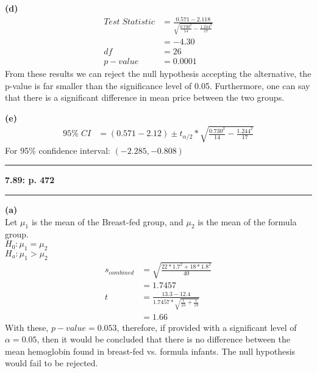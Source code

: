\documentclass[11pt]{article}
\newcommand\question[2]{\vspace{.25in}\hrule\textbf{#1: #2}\vspace{.5em}\hrule\vspace{.10in}}
\renewcommand\part[1]{\vspace{.10in}\textbf{(#1)}}
\begin{document}
\part{d}\\
	\begin{align*}
		Test\; Statistic &= \frac{0.571-2.118}{\sqrt{\frac{0.730^{2}}{14}-\frac{1.244^{2}}{17}}}\\
		&= -4.30\\
		df &= 26\\
		p-value &= 0.0001
	\end{align*}
	From these results we can reject the null hypothesis accepting the alternative, the p-value is far smaller than the significance level of 0.05. Furthermore, one can say that there is a significant difference in mean price between the two groups.

\part{e}\\
	\begin{align*}
		95\% \; CI &= (0.571-2.12) \pm t_{\alpha / 2} * \sqrt{\frac{0.730^{2}}{14}-\frac{1.244^{2}}{17}}
	\end{align*}
	For 95\% confidence interval: $(-2.285, -0.808)$

\question{7.89}{p. 472}

	\part{a}\\
		Let $\mu_{1}$ is the mean of the Breast-fed group, and $\mu_{2}$ is the mean of the formula group.\\
		$H_{0} : \mu_{1} = \mu_{2}$\\
		$H_{a} : \mu_{1} > \mu_{2}$\\
		\begin{align*}
			s_{combined} &= \sqrt{ \frac{ 22*1.7^{2} + 18*1.8^{2}}{40} }\\
			&= 1.7457\\
			t &= \frac{13.3-12.4}{1.7457*\sqrt{\frac{1}{23}+\frac{1}{19}}}\\
			&= 1.66
		\end{align*}
		With these, $p-value = 0.053$, therefore, if provided with a significant level of $\alpha = 0.05$, then it would be concluded that there is no difference between the mean hemoglobin found in breast-fed vs. formula infants. The null hypothesis would fail to be rejected.
		
\end{document}
